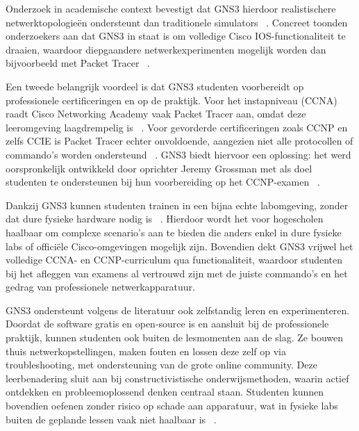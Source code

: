 \vspace{0.3cm}

Onderzoek in academische context bevestigt dat GNS3 hierdoor realistischere netwerktopologieën ondersteunt dan traditionele simulators ~\autocite{bakni2019}. Concreet toonden onderzoekers aan dat GNS3 in staat is om volledige Cisco IOS-functionaliteit te draaien, waardoor diepgaandere netwerkexperimenten mogelijk worden dan bijvoorbeeld met Packet Tracer ~\autocite{bakni2019}.

\vspace{0.3cm}

Een tweede belangrijk voordeel is dat GNS3 studenten voorbereidt op professionele certificeringen en op de praktijk. Voor het instapniveau (CCNA) raadt Cisco Networking Academy vaak Packet Tracer aan, omdat deze leeromgeving laagdrempelig is ~\autocite{gns3_docs2025}. Voor gevorderde certificeringen zoals CCNP en zelfs CCIE is Packet Tracer echter onvoldoende, aangezien niet alle protocollen of commando’s worden ondersteund ~\autocite{gns3_docs2025}. GNS3 biedt hiervoor een oplossing: het werd oorspronkelijk ontwikkeld door oprichter Jeremy Grossman met als doel studenten te ondersteunen bij hun voorbereiding op het CCNP-examen ~\autocite{gns3_docs2025}.

\vspace{0.3cm}

Dankzij GNS3 kunnen studenten trainen in een bijna echte labomgeving, zonder dat dure fysieke hardware nodig is ~\autocite{gns3_docs2025}. Hierdoor wordt het voor hogescholen haalbaar om complexe scenario’s aan te bieden die anders enkel in dure fysieke labs of officiële Cisco-omgevingen mogelijk zijn. Bovendien dekt GNS3 vrijwel het volledige CCNA- en CCNP-curriculum qua functionaliteit, waardoor studenten bij het afleggen van examens al vertrouwd zijn met de juiste commando’s en het gedrag van professionele netwerkapparatuur.

\vspace{0.3cm}

GNS3 ondersteunt volgens de literatuur ook zelfstandig leren en experimenteren. Doordat de software gratis en open-source is en aansluit bij de professionele praktijk, kunnen studenten ook buiten de lesmomenten aan de slag. Ze bouwen thuis netwerkopstellingen, maken fouten en lossen deze zelf op via troubleshooting, met ondersteuning van de grote online community. Deze leerbenadering sluit aan bij constructivistische onderwijsmethoden, waarin actief ontdekken en probleemoplossend denken centraal staan. Studenten kunnen bovendien oefenen zonder risico op schade aan apparatuur, wat in fysieke labs buiten de geplande lessen vaak niet haalbaar is ~\autocite{Sari2018}.

